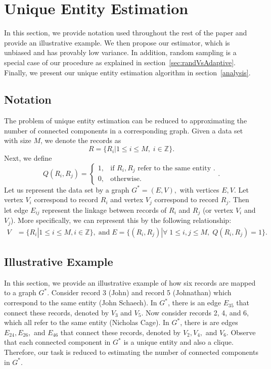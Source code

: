 \documentclass[aoas]{imsart}
\begin{document}
\section{Unique Entity Estimation}
\label{proposal}
In this section, we provide notation used throughout the rest of the paper and provide an illustrative example.
We then propose our estimator, which is unbiased and has provably low variance. In addition, random sampling is a special case of our procedure as explained in section~\ref{sec:randVsAdaptive}.  Finally, we present our unique entity estimation algorithm in section~\ref{analysis}.
\subsection{Notation}
\label{form}
The problem of unique entity estimation can be reduced to approximating the number of connected components in a corresponding graph.
%
Given a data set with size $M$, we denote the records as
$$R = \{R_i| 1\leq i \leq M, \; i \in \mathbb{Z}\}.$$
Next, we define
$$Q(R_i, R_j) =\begin{cases}
1, & \text{if $R_i, R_j$ refer to the same entity }.\\
0, & \text{otherwise}. \end{cases}.$$
Let us represent the data set by a graph $G^* = (E, V),$ with vertices $E,V.$ Let vertex $V_i$ correspond to record $R_i$ and vertex $V_j$ correspond to record $R_j$. Then let edge $E_{ij}$ represent the linkage between records of $R_i$ and $R_j$ (or
vertex $V_i$ and $V_j$). More specifically, we can represent this by the following relationship:
\begin{align*}
V &= \{R_i|1\leq i \leq M, i \in \mathbb{Z}\}, \; \text{and} \;
E = \{(R_i, R_j)| \forall\; 1\leq i, j \leq M, \; Q(R_i, R_j) = 1\}.
\end{align*}

\subsection{Illustrative Example}
\label{sec:toy}

In this section, we provide an illustrative example of how six records are mapped to a graph $G^*$.
%
Consider record 3 (John) and record 5 (Johnathan) which correspond to the same entity (John Schaech). In $G^*$, there is an edge $E_{35}$ that connect these records, denoted by $V_3$ and $V_5.$
%
Now consider records 2, 4, and 6, which all refer to the same entity (Nicholas Cage). In $G^*$, there is are edges $E_{24}, E_{26},$ and $E_{46}$  that connect these records, denoted by $V_2, V_4,$ and $V_6.$
%
Observe that each connected component in $G^*$ is a unique entity and also a clique. Therefore, our task is reduced to estimating the number of connected components in $G^*$.
\end{document}
